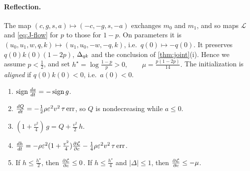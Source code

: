 \paragraph{Reflection.} The map $(c,g,s,a)\mapsto(-c,-g,s,-a)$ exchanges $m_0$ and $m_1$, and so maps $\mathcal L$ and \cref{eq:J-flow} for $p$ to those
for $1-p$. On parameters it is $(u_0,u_1,w,q,k)\mapsto(u_1,u_0,-w,-q,k)$, i.e.\ $q(0)\mapsto-q(0)$. It preserves $q(0)k(0)(1-2p)$, $\Delta_{qk}$ and the
conclusion of \cref{thm:joint}(i). Hence we assume $p<\frac{1}{2}$, and set
 $h^\star=\log\frac{1-p}{p}>0,\qquad \mu=\frac{p(1-2p)}{14}.$ 
The initialization is \emph{aligned} if $q(0)k(0)<0$, i.e.\ $a(0)<0$.

\begin{lemma}
\label{lem:J-drift}
\begin{enumerate}[label=(\alph*),leftmargin=*,itemsep=2pt,topsep=3pt]
\item $\operatorname{sign}\ddt{a}=-\operatorname{sign}g$.
\item $\ddt{Q}=-\frac{1}{2}\rho\initscale^2v^2\,\tau\,\mathrm{err}$, so $Q$ is nondecreasing while $a\le0$.
\item $(1+\frac{v^2}{4})\,g=Q+\frac{v^2}{2}\,h$.
\item $\ddt{h}=-\rho\initscale^2(1+\frac{v^2}{4})\pd{\mathcal L}{c}-\frac{1}{4}\rho\initscale^2v^2\,\tau\,\mathrm{err}$.
\item If $h\le\frac{h^\star}{2}$, then $\pd{\mathcal L}{c}\le0$. If $h\le\frac{h^\star}{4}$ and $|\Delta|\le1$, then $\pd{\mathcal L}{c}\le-\mu$.
\end{enumerate}
\end{lemma}

